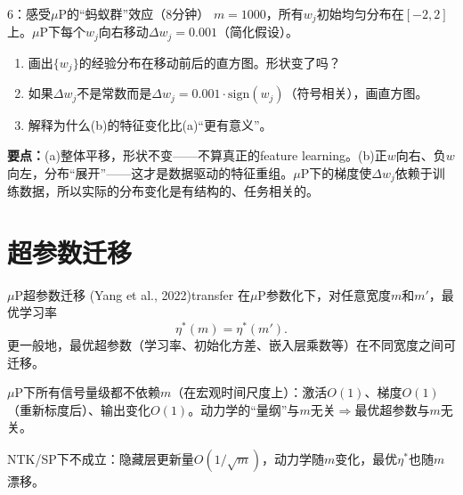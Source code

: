 \documentclass[11pt,a4paper]{article}
\begin{document}
\begin{classexercise}{6：感受$\mu$P的``蚂蚁群''效应（8分钟）}
$m=1000$，所有$w_j$初始均匀分布在$[-2,2]$上。$\mu$P下每个$w_j$向右移动$\Delta w_j = 0.001$（简化假设）。
\begin{enumerate}[label=(\alph*)]
\item 画出$\{w_j\}$的经验分布在移动前后的直方图。形状变了吗？
\item 如果$\Delta w_j$不是常数而是$\Delta w_j = 0.001\cdot\text{sign}(w_j)$（符号相关），画直方图。
\item 解释为什么(b)的特征变化比(a)``更有意义''。
\end{enumerate}

\textbf{要点：}(a)整体平移，形状不变——不算真正的feature learning。(b)正$w$向右、负$w$向左，分布``展开''——这才是数据驱动的特征重组。$\mu$P下的梯度使$\Delta w_j$依赖于训练数据，所以实际的分布变化是有结构的、任务相关的。
\end{classexercise}

\section{超参数迁移}

\begin{theorem}{$\mu$P超参数迁移 (Yang et al., 2022)}{transfer}
在$\mu$P参数化下，对任意宽度$m$和$m'$，最优学习率
\[
\eta^*(m) = \eta^*(m').
\]
更一般地，最优超参数（学习率、初始化方差、嵌入层乘数等）在不同宽度之间可迁移。
\end{theorem}

\begin{keyinsight}[——为什么迁移成立]
$\mu$P下所有信号量级都不依赖$m$（在宏观时间尺度上）：激活$O(1)$、梯度$O(1)$（重新标度后）、输出变化$O(1)$。动力学的``量纲''与$m$无关$\Rightarrow$最优超参数与$m$无关。

NTK/SP下不成立：隐藏层更新量$O(1/\sqrt{m})$，动力学随$m$变化，最优$\eta^*$也随$m$漂移。
\end{keyinsight}
\end{document}
